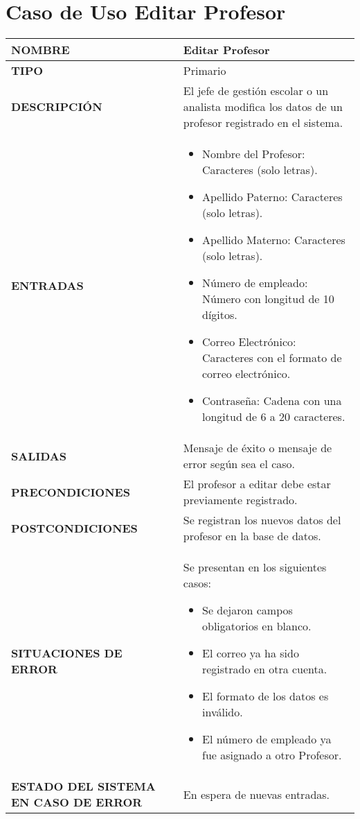\newpage
\section{Caso de Uso Editar Profesor}
\begin{longtable}{ | p{6cm} | p{10cm} |}
    \hline
    \textbf{NOMBRE} & Editar Profesor\\
    \hline
    \textbf{TIPO} & Primario\\
    \hline
    \textbf{DESCRIPCIÓN} & El jefe de gestión escolar o un analista modifica los datos de un profesor registrado en el sistema.\\
    \hline
    \textbf{ENTRADAS} &
    \begin{itemize}
    	\item Nombre del Profesor: Caracteres (solo letras).
    	\item Apellido Paterno: Caracteres (solo letras).
    	\item Apellido Materno: Caracteres (solo letras).
    	\item Número de empleado: Número con longitud de 10 dígitos.
    	\item Correo Electrónico: Caracteres con el formato de correo electrónico.
    	\item Contraseña: Cadena con una longitud de 6 a 20 caracteres.
    \end{itemize}\\  
    \hline
    \textbf{SALIDAS} & Mensaje de éxito o mensaje de error según sea el caso.\\
    \hline
    \textbf{PRECONDICIONES} & El profesor a editar debe estar previamente registrado.\\
    \hline
    \textbf{POSTCONDICIONES} & Se registran los nuevos datos del profesor en la base de datos.\\
    \hline
    \textbf{SITUACIONES DE ERROR} &Se presentan en los siguientes casos:
    \begin{itemize}
    	\item Se dejaron campos obligatorios en blanco.
    	\item El correo ya ha sido registrado en otra cuenta.
    	\item El formato de los datos es inválido.
    	\item El número de empleado ya fue asignado a otro Profesor.
    \end{itemize}\\
    \hline
    \textbf{ESTADO DEL SISTEMA EN CASO DE ERROR} &  En espera de nuevas entradas.\\

\end{longtable}
